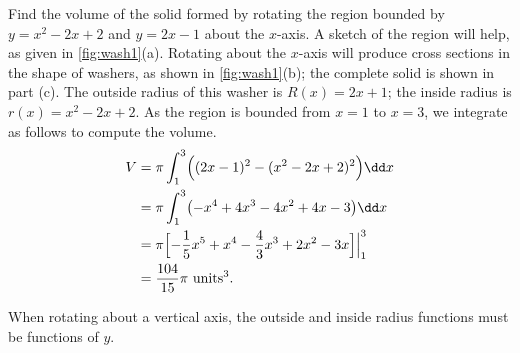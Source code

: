\begin{example}\label{ex_wash1}%
Find the volume of the solid formed by rotating the region bounded by $y=x^2-2x+2$ and $y=2x-1$ about the $x$-axis.
\solution
A sketch of the region will help, as given in \autoref{fig:wash1}(a). Rotating about the $x$-axis will produce cross sections in the shape of washers, as shown in \autoref{fig:wash1}(b); the complete solid is shown in part (c). The outside radius of this washer is $R(x) = 2x+1$; the inside radius is $r(x) = x^2-2x+2$. As the region is bounded from $x=1$ to $x=3$, we integrate as follows to compute the volume.
\begin{align*}
V &= \pi\int_1^3 \Bigl((2x-1)^2-(x^2-2x+2)^2\Bigr)\dd x \\
		&= \pi\int_1^3 \bigl(-x^4+4x^3-4x^2+4x-3\bigr)\dd x \\
		&= \pi\Bigl[-\frac{1}{5}x^5+x^4-\frac43x^3+2x^2-3x\Bigr]\Big|_1^3 \\
		&=\frac{104}{15}\pi %
		\ \text{units}^3.
\end{align*}
\end{example}

When rotating about a vertical axis, the outside and inside radius functions must be functions of $y$.


